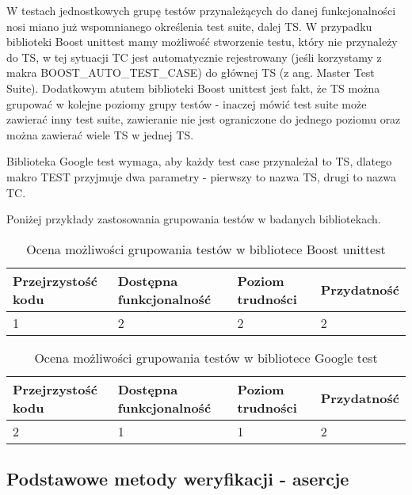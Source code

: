 \documentclass[12pt,a4paper,notitlepage]{report}
\begin{document}
W testach jednostkowych grupę testów przynależących do danej funkcjonalności nosi miano już wspomnianego określenia test suite, dalej TS. 
W przypadku biblioteki Boost unittest mamy możliwość stworzenie testu, który nie przynależy do TS, w tej sytuacji TC jest automatycznie rejestrowany (jeśli korzystamy z makra BOOST{\_}AUTO{\_}TEST{\_}CASE) do głównej TS (z ang. Master Test Suite).
Dodatkowym atutem biblioteki Boost unittest jest fakt, że TS można grupować w kolejne poziomy grupy testów - inaczej mówić test suite może zawierać inny test suite, zawieranie nie jest ograniczone do jednego poziomu oraz można zawierać wiele TS w jednej TS.

Biblioteka Google test wymaga, aby każdy test case przynależał to TS, dlatego makro TEST przyjmuje dwa parametry - pierwszy to nazwa TS, drugi to nazwa TC.

Poniżej przykłady zastosowania grupowania testów w badanych bibliotekach.

\begin{center}
			\begin{table}[!ht]
			\caption{Ocena możliwości grupowania testów w bibliotece Boost unittest}
			\label{}
			\begin{tabular}[!hc]{|l|l|l|l|}
		\hline
		Przejrzystość kodu 	&	Dostępna funkcjonalność	&	Poziom trudności	&	Przydatność \\ \hline
		1					&	2						&	2					& 	2  			\\ \hline
			\end{tabular}
			\end{table} 
		\end{center}

\begin{center}
			\begin{table}[!ht]
			\caption{Ocena możliwości grupowania testów w bibliotece Google test}
			\label{}
			\begin{tabular}[!hc]{|l|l|l|l|}
		\hline
		Przejrzystość kodu 	&	Dostępna funkcjonalność	&	Poziom trudności	&	Przydatność \\ \hline
		2					&	1						&	1					& 	2  			\\ \hline
			\end{tabular}
			\end{table} 
		\end{center}

\subsection{Podstawowe metody weryfikacji - asercje}
\end{document}
